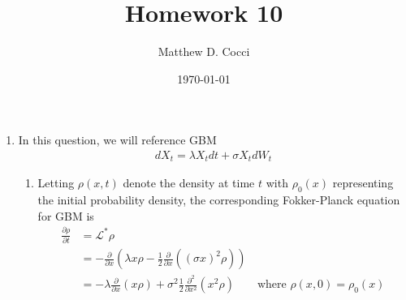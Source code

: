 \documentclass[12pt]{article}
\author{Matthew D. Cocci}
\title{Homework 10}
\date{\today}
\theoremstyle{plain}
\theoremstyle{definition}
\theoremstyle{remark}
\begin{document}
\maketitle



\begin{enumerate}
  \item %
    In this question, we will reference GBM
    \begin{align*}
      dX_t = \lambda X_t dt + \sigma X_t dW_t
    \end{align*}
    \begin{enumerate}
      \item %
        Letting $\rho(x,t)$ denote the density at time $t$ with
        $\rho_0(x)$ representing the initial probability density, the
        corresponding Fokker-Planck equation for GBM is
        \begin{align*}
          \frac{\partial \rho}{\partial t}
          &= \mathscr{L}^*\rho\\
          &= -\frac{\partial}{\partial x}
            \left(
            \lambda x \rho - \frac{1}{2}
            \frac{\partial}{\partial x}\left((\sigma x)^2\rho\right)
            \right)\\
          &= -\lambda \frac{\partial}{\partial x}
            \left( x \rho\right)
            + \sigma^2 \frac{1}{2}
            \frac{\partial^2}{\partial x^2}(x^2\rho)
          \qquad \text{where } \rho(x,0) = \rho_0(x)
        \end{align*}


\end{enumerate}
\end{enumerate}
\end{document}

